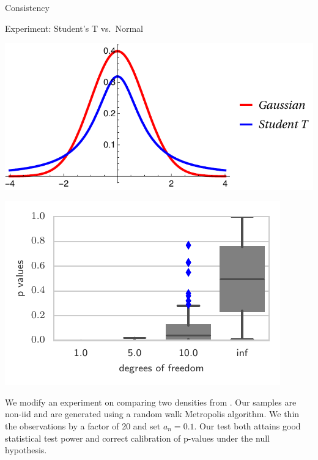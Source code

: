 \begin{frame}
\begin{columns}
\begin{column}{.32\linewidth}
\begin{block}{Consistency}
\end{block}


\vspace{-0.75cm}
\begin{block}{Experiment: Student's T vs.\ Normal}

\begin{center}
\begin{minipage}{.45\linewidth}
\includegraphics[width=\textwidth]{../../presentation/img/nt}
\end{minipage}
\begin{minipage}{.45\linewidth}
 \includegraphics[width=\textwidth]{../../presentation/img/sgld_student_opt} 
\end{minipage}
\end{center}



We modify an experiment on comparing two densities from \cite{gorham2015measuring}. Our samples are non-iid and are generated using a random walk Metropolis algorithm.  We thin the observations by a factor of 20 and
set $a_{n}=0.1$. Our test both attains good statistical test power and
correct calibration of p-values under the null hypothesis.


\end{block}
\end{column}
\end{columns}
\end{frame}
